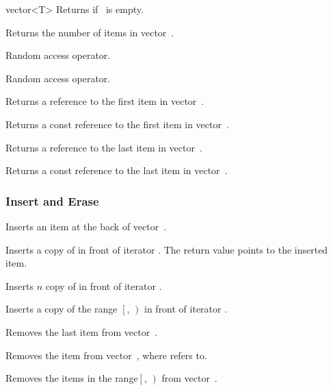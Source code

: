 \begin{ccClassTemplate} {vector<T>}
	{Returns  if \ccVar\ is empty.}

	{Returns the number of items in vector~\ccVar.}

{Random access operator.}

{Random access operator.}

       {Returns a reference to the first item in vector~\ccVar.}

\renewcommand{\ccTagRmTrailingConst}{\ccFalse}
       {Returns a const reference to the first item in vector~\ccVar.}
\renewcommand{\ccTagRmTrailingConst}{\ccTrue}


       {Returns a reference to the last item in vector~\ccVar.}

\renewcommand{\ccTagRmTrailingConst}{\ccFalse}
       {Returns a const reference to the last item in vector~\ccVar.}
\renewcommand{\ccTagRmTrailingConst}{\ccTrue}

\subsubsection*{Insert and Erase}

       {Inserts an item at the back of vector~\ccVar.}

 {Inserts a copy of  in front of iterator .
  The return value points to the inserted item.}


 {Inserts $n$ copy of  in front of iterator .}


 {Inserts a copy of the range $\left[\right.$, $\left.\right)$
  in front of iterator .}

 {Removes the last item from vector~\ccVar.}

 {Removes the item from vector~\ccVar, where  refers to.}

 {Removes the items in the range$\left[\right.$, 
  $\left.\right)$ from vector~\ccVar.}




\end{ccClassTemplate} 
